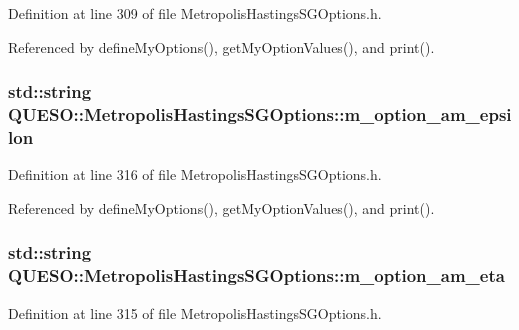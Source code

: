 Definition at line 309 of file Metropolis\-Hastings\-S\-G\-Options.\-h.



Referenced by define\-My\-Options(), get\-My\-Option\-Values(), and print().

\hypertarget{class_q_u_e_s_o_1_1_metropolis_hastings_s_g_options_a7a7a303ed2fc5905cb58a42ea53c1d66}{
\subsubsection[{m\-\_\-option\-\_\-am\-\_\-epsilon}]{\setlength{\rightskip}{0pt plus 5cm}std\-::string Q\-U\-E\-S\-O\-::\-Metropolis\-Hastings\-S\-G\-Options\-::m\-\_\-option\-\_\-am\-\_\-epsilon\hspace{0.3cm}{\ttfamily [private]}}}\label{class_q_u_e_s_o_1_1_metropolis_hastings_s_g_options_a7a7a303ed2fc5905cb58a42ea53c1d66}


Definition at line 316 of file Metropolis\-Hastings\-S\-G\-Options.\-h.



Referenced by define\-My\-Options(), get\-My\-Option\-Values(), and print().

\hypertarget{class_q_u_e_s_o_1_1_metropolis_hastings_s_g_options_af33c4f035c1e61c9c2109621ee2c61df}{
\subsubsection[{m\-\_\-option\-\_\-am\-\_\-eta}]{\setlength{\rightskip}{0pt plus 5cm}std\-::string Q\-U\-E\-S\-O\-::\-Metropolis\-Hastings\-S\-G\-Options\-::m\-\_\-option\-\_\-am\-\_\-eta\hspace{0.3cm}{\ttfamily [private]}}}\label{class_q_u_e_s_o_1_1_metropolis_hastings_s_g_options_af33c4f035c1e61c9c2109621ee2c61df}


Definition at line 315 of file Metropolis\-Hastings\-S\-G\-Options.\-h.




